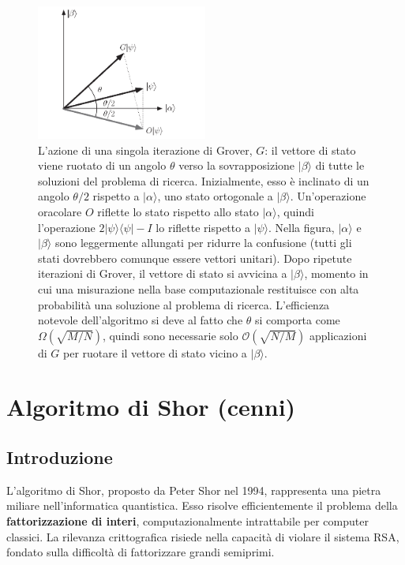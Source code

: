 \documentclass[a4paper,12pt]{report}
\theoremstyle{plain}
\begin{document}
\begin{figure}[H]
    \centering
    \includegraphics[width=0.5\textwidth]{Immagine19.png} 
    \caption{L'azione di una singola iterazione di Grover, \( G \): il vettore di stato viene ruotato di un angolo \( \theta \) verso la sovrapposizione \( \lvert \beta \rangle \) di tutte le soluzioni del problema di ricerca. Inizialmente, esso è inclinato di un angolo \( \theta/2 \) rispetto a \( \lvert \alpha \rangle \), uno stato ortogonale a \( \lvert \beta \rangle \). Un'operazione oracolare \( O \) riflette lo stato rispetto allo stato \( \lvert \alpha \rangle \), quindi l'operazione \( 2 \lvert \psi \rangle \langle \psi \rvert - I \) lo riflette rispetto a \( \lvert \psi \rangle \). Nella figura, \( \lvert \alpha \rangle \) e \( \lvert \beta \rangle \) sono leggermente allungati per ridurre la confusione (tutti gli stati dovrebbero comunque essere vettori unitari). Dopo ripetute iterazioni di Grover, il vettore di stato si avvicina a \( \lvert \beta \rangle \), momento in cui una misurazione nella base computazionale restituisce con alta probabilità una soluzione al problema di ricerca. L'efficienza notevole dell'algoritmo si deve al fatto che \( \theta \) si comporta come \( \Omega(\sqrt{M/N}) \), quindi sono necessarie solo \( \mathcal{O}(\sqrt{N/M}) \) applicazioni di \( G \) per ruotare il vettore di stato vicino a \( \lvert \beta \rangle \).}
    \label{Immagine19}
\end{figure}

\section{Algoritmo di Shor (cenni)}
\subsection{Introduzione}
L'algoritmo di Shor, proposto da Peter Shor nel 1994, rappresenta una pietra miliare nell'informatica quantistica. Esso risolve efficientemente il problema della \textbf{fattorizzazione di interi}, computazionalmente intrattabile per computer classici. La rilevanza crittografica risiede nella capacità di violare il sistema RSA, fondato sulla difficoltà di fattorizzare grandi semiprimi.
\end{document}
